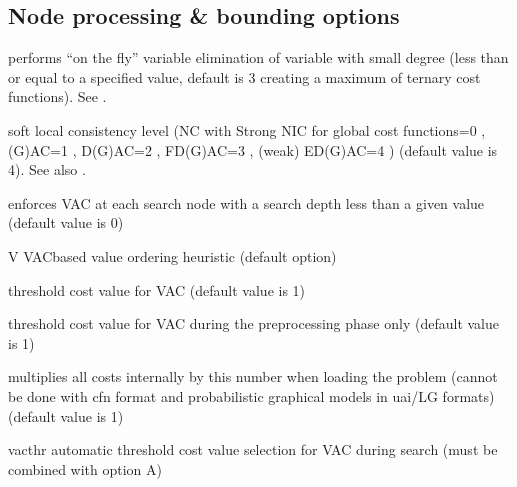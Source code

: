 \documentclass[letterpaper,10pt,openany,oneside,english]{sphinxmanual}
\begin{document}
\subsection{Node processing \& bounding options}
\label{\detokenize{userdoc:node-processing-bounding-options}}\begin{description}
\sphinxAtStartPar
performs “on the fly” variable elimination of variable with small
degree (less than or equal to a specified value, default is 3 creating
a maximum of ternary cost functions). See .

\sphinxAtStartPar
soft local consistency level (NC  with Strong NIC for global cost functions=0 , (G)AC=1  , D(G)AC=2 , FD(G)AC=3 , (weak) ED(G)AC=4  ) (default value is 4). See also  .

\sphinxAtStartPar
enforces VAC  at each search node with a search depth less than a given value (default value is 0)

\end{description}
\begin{optionlist}{3cm}
\item [\sphinxhyphen{}V]  
\sphinxAtStartPar
VAC\sphinxhyphen{}based value ordering heuristic (default option)
\end{optionlist}
\begin{description}
\sphinxAtStartPar
threshold cost value for VAC (default value is 1)

\sphinxAtStartPar
threshold cost value for VAC during the preprocessing phase only (default value is 1)

\sphinxAtStartPar
multiplies all costs internally by this number when loading the problem (cannot be done with cfn format and probabilistic graphical models in uai/LG formats) (default value is 1)

\end{description}
\begin{optionlist}{3cm}
\item [\sphinxhyphen{}vacthr]  
\sphinxAtStartPar
automatic threshold cost value selection for VAC during search (must be combined with option \sphinxhyphen{}A)
\end{optionlist}
\end{document}
